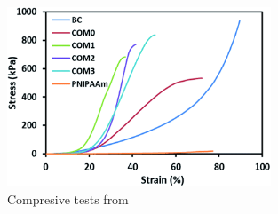 \begin{figure}[ht!]
    \centering
    \includegraphics[width=0.7\textwidth]{figs/mechResponse/7.png}
    \caption{Compresive tests from\citep{wangRapidUniaxialActuation2018}}
\end{figure}




